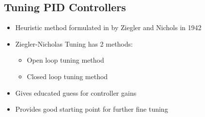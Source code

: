 \documentclass[a4paper]{article}
\begin{document}
\subsection{Tuning PID Controllers}
\begin{itemize}
    \item Heuristic method formulated in by Ziegler and Nichols in 1942
    \item Ziegler-Nicholas Tuning has 2 methods:
    \begin{itemize}[label=$\circ$]
        \item Open loop tuning method
        \item Closed loop tuning method
    \end{itemize}
    \item Gives educated guess for controller gains
    \item Provides good starting point for further fine tuning
\end{itemize}

\newpage
\end{document}
